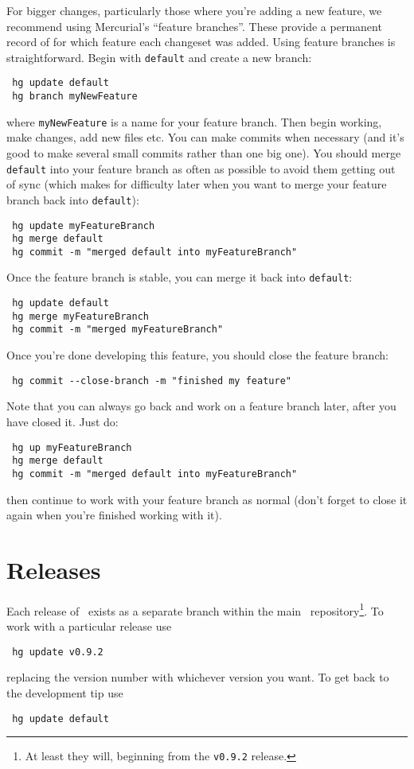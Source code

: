 For bigger changes, particularly those where you're adding a new feature, we recommend using Mercurial's ``feature branches''. These provide a permanent record of for which feature each changeset was added. Using feature branches is straightforward. Begin with {\tt default} and create a new branch:
\begin{verbatim}
 hg update default
 hg branch myNewFeature
\end{verbatim}
where {\tt myNewFeature} is a name for your feature branch. Then begin working, make changes, add new files etc. You can make commits when necessary (and it's good to make several small commits rather than one big one). You should merge {\tt default} into your feature branch as often as possible to avoid them getting out of sync (which makes for difficulty later when you want to merge your feature branch back into {\tt default}):
\begin{verbatim}
 hg update myFeatureBranch
 hg merge default
 hg commit -m "merged default into myFeatureBranch"
\end{verbatim}
Once the feature branch is stable, you can merge it back into {\tt default}:
\begin{verbatim}
 hg update default
 hg merge myFeatureBranch
 hg commit -m "merged myFeatureBranch"
\end{verbatim}
Once you're done developing this feature, you should close the feature branch:
\begin{verbatim}
 hg commit --close-branch -m "finished my feature"
\end{verbatim}
Note that you can always go back and work on a feature branch later, after you have closed it. Just do:
\begin{verbatim}
 hg up myFeatureBranch
 hg merge default
 hg commit -m "merged default into myFeatureBranch"
\end{verbatim}
then continue to work with your feature branch as normal (don't forget to close it again when you're finished working with it).

\section{Releases}

Each release of \glc\ exists as a separate branch within the main \glc\ repository\footnote{At least they will, beginning from the {\tt v0.9.2} release.}. To work with a particular release use
\begin{verbatim}
 hg update v0.9.2
\end{verbatim}
replacing the version number with whichever version you want. To get back to the development tip use
\begin{verbatim}
 hg update default
\end{verbatim}

